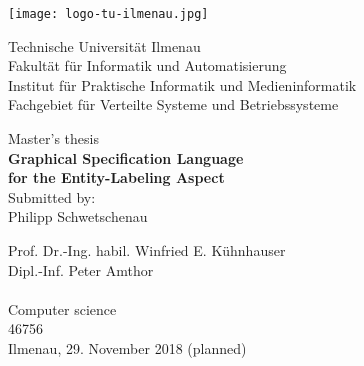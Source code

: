 \documentclass[twoside, openright, 12pt]{book}
\begin{document}
%
\begin{titlepage}
\newlength{\detailwidth}
\newlength{\detaildescriptionwidth}
\settowidth{\detailwidth}{Eingereicht:~~ Prof. Dr.-Ing. habil. Winfried E. Kühnhauser}
\settowidth{\detaildescriptionwidth}{Studies:~~} 
\begin{center}

\vfill {
	\texttt{[image: logo-tu-ilmenau.jpg]}
	\vspace{8ex}
}

\begin{normalsize}Technische Universität Ilmenau \\
Fakultät für Informatik und Automatisierung \\
Institut für Praktische Informatik und Medieninformatik \\
Fachgebiet für Verteilte Systeme und Betriebssysteme        
\end{normalsize}


\vfill {\large
	Master's thesis\\ \vspace{2ex}
	\LARGE \textbf{Graphical Specification Language \\for the Entity-Labeling Aspect} \\ \vspace{2.5ex}
	\normalsize Submitted by: \\
	\Large Philipp Schwetschenau \\ \vspace{3ex} 
}
\vfill \parbox{\detailwidth}{
	 Prof. Dr.-Ing. habil. Winfried E. Kühnhauser \\
	 Dipl.-Inf. Peter Amthor \\
	\vspace{2ex} \\
	 Computer science\\  
	 46756  
	\vspace{2ex} \\
	 Ilmenau, 29. November 2018 (planned)
}
\vspace*{\fill}
\end{center}
\end{titlepage}

\mbox{}
\thispagestyle{empty}
\cleardoublepage

\setcounter{page}{1}
\tableofcontents
\end{document}
